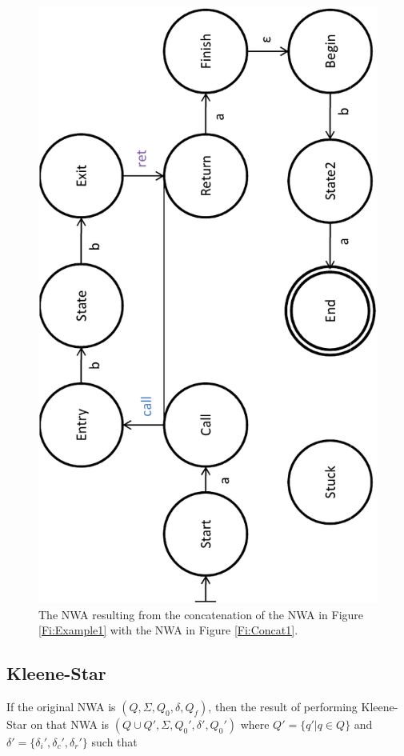 \begin{figure}[p]
  \centering
    \includegraphics[width=12cm]{Figures/Figure10}
  \caption{The NWA resulting from the concatenation of the NWA in Figure
    \ref{Fi:Example1} with the NWA in Figure \ref{Fi:Concat1}.}
  \label{Fi:Concat2}
\end{figure}


\subsection{Kleene-Star}
\label{Se:Star}

If the original NWA is $(Q, \Sigma, Q_0, \delta, Q_f)$,
then the result of performing Kleene-Star on that NWA is $(Q \cup Q', \Sigma,
Q_0', \delta', Q_0')$ where $Q' = \{q' | q \in Q\}$ and $\delta' =
\{\delta_i',\delta_c',\delta_r'\}$ such that

